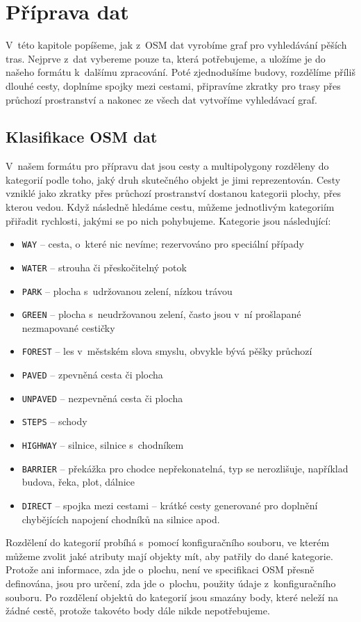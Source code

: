 \chapter{Příprava dat}
V~této kapitole popíšeme, jak z~OSM dat vyrobíme graf pro vyhledávání pěších
tras. Nejprve z~dat vybereme pouze ta, která potřebujeme, a uložíme je do
našeho formátu k~dalšímu zpracování. Poté zjednodušíme budovy, rozdělíme příliš
dlouhé cesty, doplníme spojky mezi cestami, připravíme zkratky pro trasy přes
průchozí prostranství a nakonec ze všech dat vytvoříme vyhledávací graf.

\section{Klasifikace OSM dat} \label{label:kategorie}
V~našem formátu pro přípravu dat jsou cesty a multipolygony rozděleny do
kategorií podle toho, jaký druh skutečného objekt je jimi reprezentován. Cesty vzniklé
jako zkratky přes průchozí prostranství dostanou kategorii plochy, přes kterou
vedou. Když následně hledáme cestu, můžeme jednotlivým kategoriím přiřadit
rychlosti, jakými se po nich pohybujeme. Kategorie jsou následující:
\begin{itemize}
	\item \verb|WAY| -- cesta, o~které nic nevíme; rezervováno pro speciální
	případy
	\item \verb|WATER| -- strouha či přeskočitelný potok
	\item \verb|PARK| -- plocha s~udržovanou zelení, nízkou trávou
	\item \verb|GREEN| -- plocha s~neudržovanou zelení, často jsou v~ní
	prošlapané nezmapované cestičky
	\item \verb|FOREST| -- les v~městském slova smyslu, obvykle bývá pěšky
	průchozí
	\item \verb|PAVED| -- zpevněná cesta či plocha
	\item \verb|UNPAVED| -- nezpevněná cesta či plocha
	\item \verb|STEPS| -- schody
	\item \verb|HIGHWAY| -- silnice, silnice s~chodníkem
	\item \verb|BARRIER| -- překážka pro chodce nepřekonatelná, typ se
	nerozlišuje, například budova, řeka, plot, dálnice
	\item \verb|DIRECT| -- spojka mezi cestami -- krátké cesty generované
	pro doplnění chybějících napojení chodníků na silnice apod.
\end{itemize}
Rozdělení do kategorií probíhá s~pomocí konfiguračního souboru, ve kterém můžeme
zvolit jaké atributy mají objekty mít, aby patřily do dané kategorie. Protože
ani informace, zda jde o~plochu, není ve specifikaci OSM přesně definována, jsou
pro určení, zda jde o~plochu, použity údaje z~konfiguračního souboru. Po
rozdělení objektů do kategorií jsou smazány body, které neleží na žádné cestě,
protože takovéto body dále nikde nepotřebujeme.

